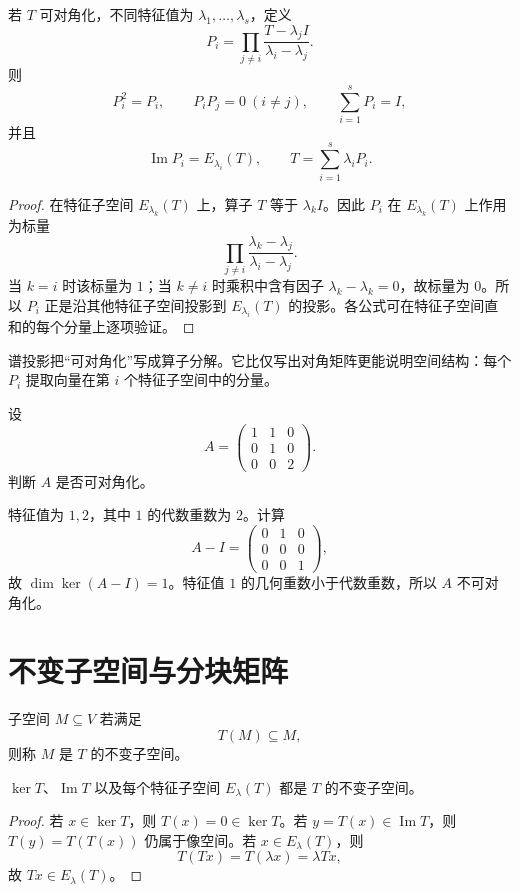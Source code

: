 \begin{theorem}[谱投影公式]
若 $T$ 可对角化，不同特征值为 $\lambda_1,\ldots,\lambda_s$，定义
\[
P_i=\prod_{j\ne i}
\frac{T-\lambda_jI}{\lambda_i-\lambda_j}.
\]
则
\[
P_i^2=P_i,\qquad
P_iP_j=0\ (i\ne j),\qquad
\sum_{i=1}^sP_i=I,
\]
并且
\[
\operatorname{Im}P_i=E_{\lambda_i}(T),
\qquad
T=\sum_{i=1}^s\lambda_iP_i.
\]
\end{theorem}
\begin{proof}
在特征子空间 $E_{\lambda_k}(T)$ 上，算子 $T$ 等于 $\lambda_kI$。因此 $P_i$ 在 $E_{\lambda_k}(T)$ 上作用为标量
\[
\prod_{j\ne i}\frac{\lambda_k-\lambda_j}
{\lambda_i-\lambda_j}.
\]
当 $k=i$ 时该标量为 $1$；当 $k\ne i$ 时乘积中含有因子 $\lambda_k-\lambda_k=0$，故标量为 $0$。所以 $P_i$ 正是沿其他特征子空间投影到 $E_{\lambda_i}(T)$ 的投影。各公式可在特征子空间直和的每个分量上逐项验证。
\end{proof}

\begin{remark}
谱投影把“可对角化”写成算子分解。它比仅写出对角矩阵更能说明空间结构：每个 $P_i$ 提取向量在第 $i$ 个特征子空间中的分量。
\end{remark}

\begin{example}[title={判定可对角化}]
设
\[
A=\begin{pmatrix}
1&1&0\\
0&1&0\\
0&0&2
\end{pmatrix}.
\]
判断 $A$ 是否可对角化。
\begin{solution}
特征值为 $1,2$，其中 $1$ 的代数重数为 $2$。计算
\[
A-I=\begin{pmatrix}0&1&0\\0&0&0\\0&0&1\end{pmatrix},
\]
故 $\dim\ker(A-I)=1$。特征值 $1$ 的几何重数小于代数重数，所以 $A$ 不可对角化。
\end{solution}
\end{example}

\section{不变子空间与分块矩阵}

\begin{definition}[不变子空间]
子空间 $M\subseteq V$ 若满足
\[
T(M)\subseteq M,
\]
则称 $M$ 是 $T$ 的不变子空间。
\end{definition}

\begin{proposition}
$\ker T$、$\operatorname{Im}T$ 以及每个特征子空间 $E_\lambda(T)$ 都是 $T$ 的不变子空间。
\end{proposition}
\begin{proof}
若 $x\in\ker T$，则 $T(x)=0\in\ker T$。若 $y=T(x)\in\operatorname{Im}T$，则 $T(y)=T(T(x))$ 仍属于像空间。若 $x\in E_\lambda(T)$，则
\[
T(Tx)=T(\lambda x)=\lambda Tx,
\]
故 $Tx\in E_\lambda(T)$。
\end{proof}

